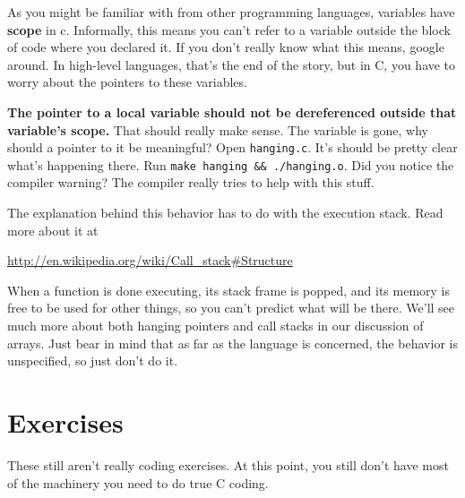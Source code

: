 \documentclass[ebook,11pt,oneside,openany]{memoir}
\begin{document}
As you might be familiar with from other programming languages, variables have \textbf{scope} in c. Informally, this means you can't refer to a variable outside the block of code where you declared it. If you don't really know what this means, google around. In high-level languages, that's the end of the story, but in C, you have to worry about the pointers to these variables.

\textbf{The pointer to a local variable should not be dereferenced outside that variable's scope.} That should really make sense. The variable is gone, why should a pointer to it be meaningful? Open \texttt{hanging.c}. It's should be pretty clear what's happening there. Run \texttt{make hanging \&\& ./hanging.o}. Did you notice the compiler warning? The compiler really tries to help with this stuff. 

The explanation behind this behavior has to do with the execution stack. Read more about it at

\url{http://en.wikipedia.org/wiki/Call_stack#Structure}

When a function is done executing, its stack frame is popped, and its memory is free to be used for other things, so you can't predict what will be there. We'll see much more about both hanging pointers and call stacks in our discussion of arrays. Just bear in mind that as far as the language is concerned, the behavior is unspecified, so just don't do it.

\section{Exercises}

These still aren't really coding exercises. At this point, you still don't have most of the machinery you need to do true C coding.
\end{document}
